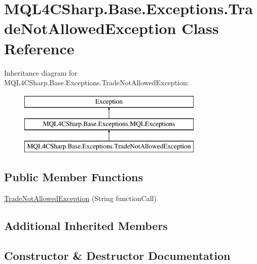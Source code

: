 \hypertarget{class_m_q_l4_c_sharp_1_1_base_1_1_exceptions_1_1_trade_not_allowed_exception}{}\section{M\+Q\+L4\+C\+Sharp.\+Base.\+Exceptions.\+Trade\+Not\+Allowed\+Exception Class Reference}
\label{class_m_q_l4_c_sharp_1_1_base_1_1_exceptions_1_1_trade_not_allowed_exception}
Inheritance diagram for M\+Q\+L4\+C\+Sharp.\+Base.\+Exceptions.\+Trade\+Not\+Allowed\+Exception\+:\begin{figure}[H]
\begin{center}
\leavevmode
\includegraphics[height=3.000000cm]{class_m_q_l4_c_sharp_1_1_base_1_1_exceptions_1_1_trade_not_allowed_exception}
\end{center}
\end{figure}
\subsection*{Public Member Functions}
\begin{DoxyCompactItemize}
\item 
\hyperlink{class_m_q_l4_c_sharp_1_1_base_1_1_exceptions_1_1_trade_not_allowed_exception_ab121cb507af6d463814e8d0f72b15b06}{Trade\+Not\+Allowed\+Exception} (String function\+Call)
\end{DoxyCompactItemize}
\subsection*{Additional Inherited Members}


\subsection{Constructor \& Destructor Documentation}
